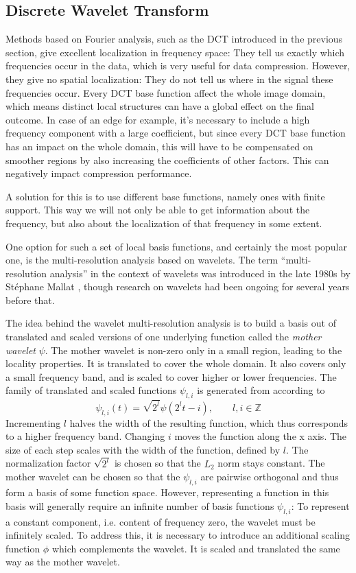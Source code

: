 \subsection{Discrete Wavelet Transform}
Methods based on Fourier analysis, such as the DCT introduced in the previous section, give excellent localization in frequency space: They tell us exactly which frequencies occur in the data, which is very useful for data compression. However, they give no spatial localization: They do not tell us where in the signal these frequencies occur. Every DCT base function affect the whole image domain, which means distinct local structures can have a global effect on the final outcome. In case of an edge for example, it's necessary to include a high frequency component with a large coefficient, but since every DCT base function has an impact on the whole domain, this will have to be compensated on smoother regions by also increasing the coefficients of other factors. This can negatively impact compression performance.

A solution for this is to use different base functions, namely ones with finite support. This way we will not only be able to get information about the frequency, but also about the localization of that frequency in some extent.

One option for such a set of local basis functions, and certainly the most popular one, is the multi-resolution analysis based on wavelets. The term “multi-resolution analysis” in the context of wavelets was introduced in the late 1980s by Stéphane Mallat \cite{mallat_theory_1989}, though research on wavelets had been ongoing for several years before that.

The idea behind the wavelet multi-resolution analysis is to build a basis out of translated and scaled versions of one underlying function called the \textit{mother wavelet} $\psi$. The mother wavelet is non-zero only in a small region, leading to the locality properties. It is translated to cover the whole domain. It also covers only a small frequency band, and is scaled to cover higher or lower frequencies. The family of translated and scaled functions $\psi_{l,i}$ is generated from   according to
\begin{equation}
\psi_{l,i}(t) = \sqrt{2^l} \psi \left(2^l t-i\right), \qquad l, i \in \mathbb{Z}
\end{equation}
Incrementing $l$ halves the width of the resulting function, which thus corresponds to a higher frequency band. Changing $i$ moves the function along the x axis. The size of each step scales with the width of the function, defined by $l$. The normalization factor $\sqrt{2^l}$ is chosen so that the $L_2$ norm stays constant. The mother wavelet can be chosen so that the $\psi_{l,i}$ are pairwise orthogonal and thus form a basis of some function space. However, representing a function in this basis will generally require an infinite number of basis functions $\psi_{l,i}$: To represent a constant component, i.e. content of frequency zero, the wavelet must be infinitely scaled. To address this, it is necessary to introduce an additional scaling function $\phi$ which complements the wavelet. It is scaled and translated the same way as the mother wavelet.

